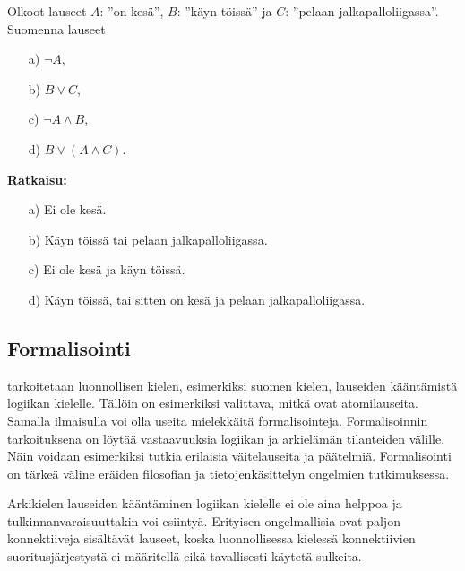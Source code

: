 \begin{esimerkki}
Olkoot lauseet $A$: ''on kesä'', $B$: ''käyn töissä'' ja $C$: ''pelaan jalkapalloliigassa''. Suomenna lauseet
\begin{itemize}
\item[a)] $\lnot A$, 
\item[b)] $B\lor C$,
\item[c)] $\lnot A\land B$,
\item[d)] $B\lor (A\land C)$.
\end{itemize}

{\bf Ratkaisu:}
\begin{itemize}
\item[a)] Ei ole kesä.
\item[b)] Käyn töissä tai pelaan jalkapalloliigassa.
\item[c)] Ei ole kesä ja käyn töissä.
\item[d)] Käyn töissä, tai sitten on kesä ja pelaan jalkapalloliigassa.
\end{itemize}
\end{esimerkki}


\subsection*{Formalisointi}
 tarkoitetaan luonnollisen kielen, esimerkiksi suomen kielen, lauseiden kääntämistä logiikan kielelle. Tällöin on esimerkiksi valittava, mitkä ovat atomilauseita. Samalla ilmaisulla voi olla useita mielekkäitä formalisointeja. Formalisoinnin tarkoituksena on löytää vastaavuuksia logiikan ja arkielämän tilanteiden välille. Näin voidaan esimerkiksi tutkia erilaisia väitelauseita ja päätelmiä. Formalisointi on tärkeä väline eräiden filosofian ja tietojenkäsittelyn ongelmien tutkimuksessa.

Arkikielen lauseiden kääntäminen logiikan kielelle ei ole aina helppoa ja tulkinnanvaraisuuttakin voi esiintyä. Erityisen ongelmallisia ovat paljon konnektiiveja sisältävät lauseet, koska luonnollisessa kielessä konnektiivien suoritusjärjestystä ei määritellä eikä tavallisesti käytetä sulkeita.

